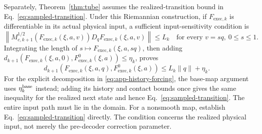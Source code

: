Separately, Theorem~\ref{thm:tube} assumes the realized-transition bound in
Eq.~\eqref{eq:sampled-transition}. Under this Riemannian construction, if
$F_{\mathrm{exec},k}$ is differentiable in its actual physical input, a
sufficient input-sensitivity condition is
\[
\left\|M_{c,k+1}^{1/2}(F_{\mathrm{exec},k}(\xi,a,v))
D_qF_{\mathrm{exec},k}(\xi,a,v)\right\|\le L_k
\quad\text{for every }v=sq,\ 0\le s\le1.
\]
Integrating the length of $s\mapsto F_{\mathrm{exec},k}(\xi,a,sq)$, then
adding $d_{k+1}(F_{\mathrm{exec},k}(\xi,a,0),F_{\mathrm{exec},k}^0(\xi,a))
\le\eta_k$, proves
\begin{equation}
d_{k+1}(F_{\mathrm{exec},k}(\xi,a,q),F_{\mathrm{exec},k}^0(\xi,a))
\le L_k\|q\|+\eta_k.
\label{eq:app-input-assumption}
\end{equation}
For the explicit decomposition in \eqref{eq:app-history-forcing}, the
base-map argument uses $\eta_k^{\rm base}$ instead; adding its history
and contact bounds once gives the same inequality for the realized next
state and hence Eq.~\eqref{eq:sampled-transition}. The entire input path must
lie in the domain. For a nonsmooth map, establish
Eq.~\eqref{eq:sampled-transition} directly. The condition concerns the
realized physical input, not merely the pre-decoder correction parameter.

